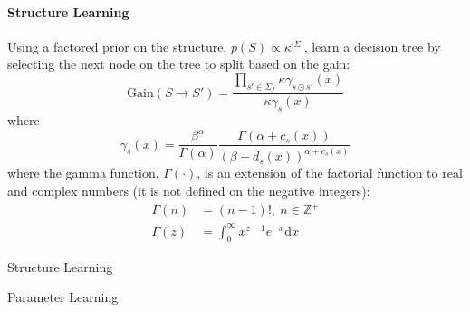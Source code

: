 \documentclass[12pt]{article}
\theoremstyle{plain}
\theoremstyle{definition}
\theoremstyle{remark}
\begin{document}
\paragraph{Structure Learning}
Using a factored prior on the structure, $p(S) \propto \kappa^{|\Sigma|}$,
learn a decision tree \citep{chihecmee97} by selecting the next node on the tree
to split based on the gain:
\begin{equation*}
  \mathrm{Gain}(S \to S') =
  \frac{\prod_{s'\in\Sigma_f}\kappa\gamma_{s \odot s'}(x)}{\kappa\gamma_s(x)}
\end{equation*}
where
\begin{equation*}
  \gamma_s(x) =
  \frac{\beta^{\alpha}}{\Gamma(\alpha)}\frac{\Gamma(\alpha + c_s(x))}{(\beta + d_s(x))^{\alpha + c_s(x)}}
\end{equation*}
where the gamma function, $\Gamma(\cdot)$, is an extension of the factorial
function to real and complex numbers
(it is not defined on the negative integers):
\begin{align*}
  \Gamma(n) & = (n-1)!,\ n\in\mathbb{Z}^+ \\
  \Gamma(z) & = \int_0^{\infty}x^{z-1}e^{-x}\mathrm{d}x
\end{align*}

\begin{algorithm}[H]
\DontPrintSemicolon
{}
\Parameters{$\alpha,\beta,\kappa$}
\caption{Structure Learning}
\label{algo:structure}
\end{algorithm}

\begin{algorithm}[H]
\DontPrintSemicolon
{}
\Parameters{$\alpha,\beta$}
\caption{Parameter Learning}
\label{algo:parameters}
\end{algorithm}



\end{document}

